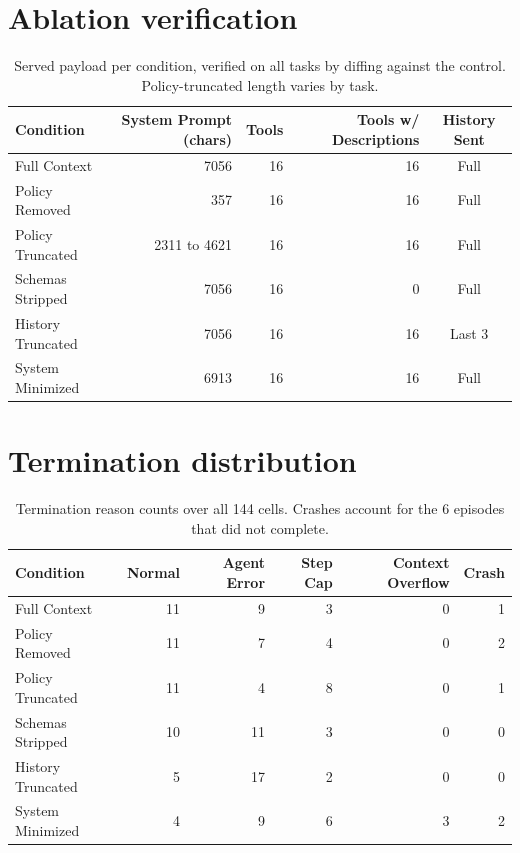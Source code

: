 \documentclass{article}
\begin{document}
\appendix

\section{Ablation verification}
\label{app:verify}

\begin{table}[!ht]
\centering
\small
\caption{Served payload per condition, verified on all tasks by diffing against the
control. Policy-truncated length varies by task.}
\begin{tabular}{lrrrc}
\toprule
Condition & System Prompt (chars) & Tools & Tools w/ Descriptions & History Sent \\
\midrule
Full Context & 7056 & 16 & 16 & Full \\
Policy Removed & 357 & 16 & 16 & Full \\
Policy Truncated & 2311 to 4621 & 16 & 16 & Full \\
Schemas Stripped & 7056 & 16 & 0 & Full \\
History Truncated & 7056 & 16 & 16 & Last 3 \\
System Minimized & 6913 & 16 & 16 & Full \\
\bottomrule
\end{tabular}
\end{table}

\FloatBarrier
\section{Termination distribution}
\label{app:term}

\begin{table}[!ht]
\centering
\small
\caption{Termination reason counts over all 144 cells. Crashes account for the 6
episodes that did not complete.}
\begin{tabular}{lrrrrr}
\toprule
Condition & Normal & Agent Error & Step Cap & Context Overflow & Crash \\
\midrule
Full Context & 11 & 9 & 3 & 0 & 1 \\
Policy Removed & 11 & 7 & 4 & 0 & 2 \\
Policy Truncated & 11 & 4 & 8 & 0 & 1 \\
Schemas Stripped & 10 & 11 & 3 & 0 & 0 \\
History Truncated & 5 & 17 & 2 & 0 & 0 \\
System Minimized & 4 & 9 & 6 & 3 & 2 \\
\bottomrule
\end{tabular}
\end{table}
\end{document}
